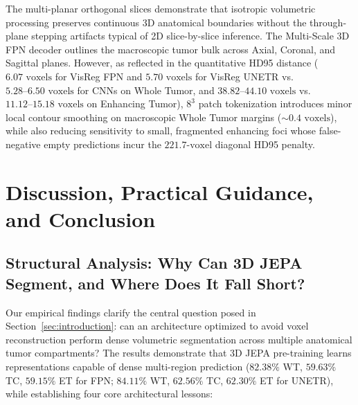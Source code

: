 \documentclass{article}
\begin{document}
The multi-planar orthogonal slices demonstrate that isotropic volumetric processing preserves continuous 3D anatomical boundaries without the through-plane stepping artifacts typical of 2D slice-by-slice inference. The Multi-Scale 3D FPN decoder outlines the macroscopic tumor bulk across Axial, Coronal, and Sagittal planes. However, as reflected in the quantitative HD95 distance ($6.07\text{ voxels}$ for VisReg FPN and $5.70\text{ voxels}$ for VisReg UNETR vs.\ $5.28\text{--}6.50\text{ voxels}$ for CNNs on Whole Tumor, and $38.82\text{--}44.10\text{ voxels}$ vs.\ $11.12\text{--}15.18\text{ voxels}$ on Enhancing Tumor), $8^3$ patch tokenization introduces minor local contour smoothing on macroscopic Whole Tumor margins ($\sim 0.4\text{ voxels}$), while also reducing sensitivity to small, fragmented enhancing foci whose false-negative empty predictions incur the $221.7\text{-voxel}$ diagonal HD95 penalty.


\section{Discussion, Practical Guidance, and Conclusion}
\label{sec:discussion}

\subsection{Structural Analysis: Why Can 3D JEPA Segment, and Where Does It Fall Short?}
\label{sec:resolving_paradox}

Our empirical findings clarify the central question posed in Section~\ref{sec:introduction}: can an architecture optimized to avoid voxel reconstruction perform dense volumetric segmentation across multiple anatomical tumor compartments? The results demonstrate that 3D JEPA pre-training learns representations capable of dense multi-region prediction ($82.38\%$ WT, $59.63\%$ TC, $59.15\%$ ET for FPN; $84.11\%$ WT, $62.56\%$ TC, $62.30\%$ ET for UNETR), while establishing four core architectural lessons:
\end{document}

